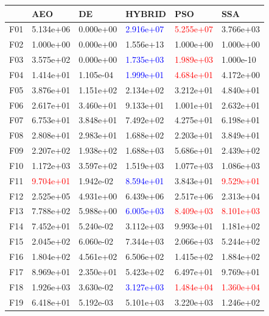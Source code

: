 \documentclass{article}
\begin{document}
\begin{table}[H]
	\centering
\begin{tabular}{|l|lllll|}
	\hline
	{} &        AEO &         DE &     HYBRID &        PSO &        SSA \\
	\hline
	F01  &  5.134e+06 &  0.000e+00 &  \textcolor{blue}{2.916e+07} &  \textcolor{red}{5.255e+07} &  3.766e+03 \\
	F02  &  1.000e+00 &  0.000e+00 &  1.556e+13 &  1.000e+00 &  1.000e+00 \\
	F03  &  3.575e+02 &  0.000e+00 &  \textcolor{blue}{1.735e+03} &  \textcolor{red}{1.989e+03} &  1.000e-10 \\
	F04  &  1.414e+01 &  1.105e-04 &  \textcolor{blue}{1.999e+01} &  \textcolor{red}{4.684e+01} &  4.172e+00 \\
	F05  &  3.876e+01 &  1.151e+02 &  2.134e+02 &  3.212e+01 &  4.840e+01 \\
	F06  &  2.617e+01 &  3.460e+01 &  9.133e+01 &  1.001e+01 &  2.632e+01 \\
	F07  &  6.753e+01 &  3.848e+01 &  7.492e+02 &  4.275e+01 &  6.198e+01 \\
	F08  &  2.808e+01 &  2.983e+01 &  1.688e+02 &  2.203e+01 &  3.849e+01 \\
	F09  &  2.207e+02 &  1.938e+02 &  1.688e+03 &  5.686e+01 &  2.439e+02 \\
	F10  &  1.172e+03 &  3.597e+02 &  1.519e+03 &  1.077e+03 &  1.086e+03 \\
	F11  &  \textcolor{red}{9.704e+01} &  1.942e-02 &  \textcolor{blue}{8.594e+01} &  3.843e+01 &  \textcolor{red}{9.529e+01} \\
	F12  &  2.525e+05 &  4.931e+00 &  6.439e+06 &  2.517e+06 &  2.313e+04 \\
	F13  &  7.788e+02 &  5.988e+00 &  \textcolor{blue}{6.005e+03} &  \textcolor{red}{8.409e+03} &  \textcolor{red}{8.101e+03} \\
	F14  &  7.452e+01 &  5.240e-02 &  3.112e+03 &  9.993e+01 &  1.181e+02 \\
	F15  &  2.045e+02 &  6.060e-02 &  7.344e+03 &  2.066e+03 &  5.244e+02 \\
	F16  &  1.804e+02 &  4.561e+02 &  6.506e+02 &  1.415e+02 &  1.884e+02 \\
	F17  &  8.969e+01 &  2.350e+01 &  5.423e+02 &  6.497e+01 &  9.769e+01 \\
	F18  &  1.926e+03 &  3.630e-02 &  \textcolor{blue}{3.127e+03} &  \textcolor{red}{1.484e+04} &  \textcolor{red}{1.360e+04} \\
	F19  &  6.418e+01 &  5.192e-03 &  5.101e+03 &  3.220e+03 &  1.246e+02 \\

\end{tabular}
\end{table}
\end{document}

